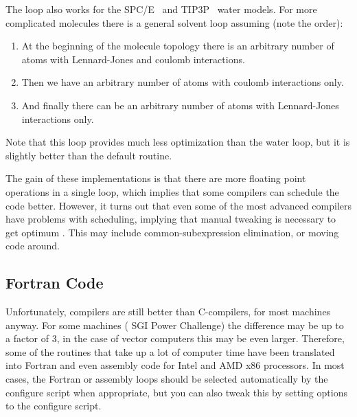 The loop also works for the SPC/E~\cite{Berendsen87} and 
TIP3P~\cite{Jorgensen83} water models. For more complicated molecules
there is a general solvent loop assuming
(note the order):
\begin{enumerate}
\item   At the beginning of the molecule topology there is
        an arbitrary number of atoms with Lennard-Jones and
        coulomb interactions.
\item   Then we have an arbitrary number of atoms with coulomb interactions only.
\item   And finally there can be an arbitrary number of 
        atoms with Lennard-Jones interactions only.
\end{enumerate}
Note that this loop provides much less optimization than the water
loop, but it is slightly better than the default routine.

The gain of these implementations is that there are more floating point
operations in a single loop, which implies that some compilers
can schedule the code better. However, it turns out that even
some of the most advanced compilers have problems with scheduling, 
implying that manual tweaking is necessary to get optimum 
.
This may include common-subexpression elimination, or moving
code around. 

\subsection{Fortran Code}
Unfortunately,  compilers are still better than
C-compilers, for most machines anyway. For some machines ({\eg} SGI
Power Challenge) the difference may be up to a factor of 3, in the
case of vector computers this may be even larger. Therefore, some of
the routines that take up a lot of computer time have been translated
into Fortran and even assembly code for Intel and AMD x86 processors.
In most cases, the Fortran or assembly loops should be selected 
automatically by the configure script when appropriate, but you can
also tweak this by setting options to the configure script.




